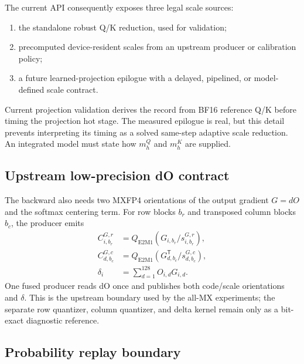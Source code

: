 The current API consequently exposes three legal scale sources:

\begin{enumerate}
  \item the standalone robust Q/K reduction, used for validation;
  \item precomputed device-resident scales from an upstream producer or
  calibration policy;
  \item a future learned-projection epilogue with a delayed, pipelined, or
  model-defined scale contract.
\end{enumerate}

Current projection validation derives the record from BF16 reference Q/K
before timing the projection hot stage.  The measured epilogue is real, but
this detail prevents interpreting its timing as a solved same-step adaptive
scale reduction.  An integrated model must state how $m^Q_h$ and $m^K_h$ are
supplied.

\subsection{Upstream low-precision dO contract}

The backward also needs two MXFP4 orientations of the output gradient
$G=dO$ and the softmax centering term.  For row blocks $b_r$ and transposed
column blocks $b_c$, the producer emits
\begin{align}
  C^{G,r}_{i,b_r}&=Q_{\mathrm{E2M1}}
    \!\left(G_{i,b_r}/s^{G,r}_{i,b_r}\right),\\
  C^{G,c}_{d,b_c}&=Q_{\mathrm{E2M1}}
    \!\left(G^{\mathsf T}_{d,b_c}/s^{G,c}_{d,b_c}\right),\\
  \delta_i&=\sum_{d=1}^{128}O_{i,d}G_{i,d}.
  \label{eq:upstream-dout-contract}
\end{align}
One fused producer reads dO once and publishes both code/scale orientations
and $\delta$.  This is the upstream boundary used by the all-MX experiments;
the separate row quantizer, column quantizer, and delta kernel remain only as
a bit-exact diagnostic reference.

\subsection{Probability replay boundary}

